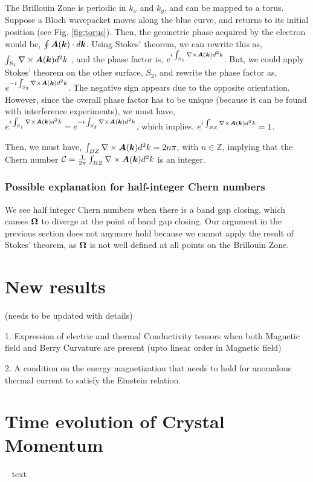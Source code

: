 \documentclass{report}
\renewcommand\vec[1]{\ensuremath\boldsymbol{#1}} %
\begin{document}
The Brillouin Zone is periodic in $k_x$ and $k_y$, and can be mapped to a torus. Suppose a Bloch wavepacket moves along the blue curve, and returns to its initial position (see Fig. \ref{fig:torus}). Then, the geometric phase acquired by the electron would be, $\oint \vec{A}(\vec{k})\cdot d\vec{k}$. Using Stokes' theorem, we can rewrite this as, $\int_{S_1} \nabla \times \vec{A}(\vec{k}) d^2 k$ , and the phase factor is, $e^{i\int_{S_1} \nabla \times \vec{A}(\vec{k}) d^2 k}$. But, we could apply Stokes' theorem on the other surface, $S_2$, and rewrite the phase factor as, $e^{-i\int_{S_2} \nabla \times \vec{A}(\vec{k}) d^2 k}$. The negative sign appears due to the opposite orientation.
However, since the overall phase factor has to be unique (because it can be found with interference experiments), we must have, $e^{i\int_{S_1} \nabla \times \vec{A}(\vec{k}) d^2 k} = e^{-i\int_{S_2} \nabla \times \vec{A}(\vec{k}) d^2 k}$, which implies, $e^{i\int_{B Z} \nabla \times \vec{A}(\vec{k}) d^2 k} = 1$.

Then, we must have, $\int_{B Z} \nabla \times \vec{A}(\vec{k}) d^2 k = 2 n \pi$, with $n \in \mathbb{Z}$, implying that the Chern number $\mathcal{C}=\frac{1}{2\pi} \int_{B Z} \nabla \times \vec{A}(\vec{k}) d^2 k$ is an integer.

\subsection{Possible explanation for half-integer Chern numbers}
We see half integer Chern numbers when there is a band gap closing, which causes $\vec{\Omega}$ to diverge at the point of band gap closing. Our argument in the previous section does not anymore hold because we cannot apply the result of Stokes' theorem, as $\vec{\Omega}$ is not well defined at all points on the Brillouin Zone.


\chapter{New results}
(needs to be updated with details)

1. Expression of electric and thermal Conductivity tensors when both Magnetic field and Berry Curvature are present (upto linear order in Magnetic field)

2. A condition on the energy magnetization that needs to hold for anomalous thermal current to satisfy the Einstein relation.

\appendix
\chapter{Time evolution of Crystal Momentum}~\label{app:crystal-momentum-time-evolution}
text
\end{document}
